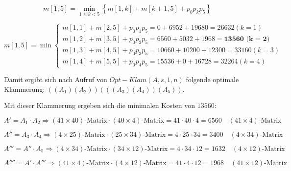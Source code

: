 \documentclass{article}
\begin{document}
\begin{equation}
m[1, 5] = \min\limits_{1 \leq k < 5} \left\{ m[1, k] + m[k + 1, 5] + p_0p_kp_5 \right\}
\end{equation}

\begin{equation}
m[1, 5] = \min\begin{cases}
  m[1, 1] + m[2, 5] + p_0p_1p_5 = 0 + 6952 + 19680 = 26632 (k = 1) \\
  m[1, 2] + m[3, 5] + p_0p_2p_5 = 6560 + 5032 + 1968 = \textbf{13560 (k = 2)} \\
  m[1, 3] + m[4, 5] + p_0p_3p_5 = 10660 + 10200 + 12300 = 33160 (k = 3) \\
  m[1, 4] + m[5, 5] + p_0p_4p_5 = 15536 + 0 + 16728 = 32264 (k = 4)
\end{cases}
\end{equation}

\clearpage

Damit ergibt sich nach Aufruf von $Opt-Klam(A, s, 1, n)$ folgende optimale
Klammerung:
$\left( \left( A_1 \right) \left( A_2 \right) \right) \left( \left( \left( A_3 \right) \left( A_4 \right) \right) \left( A_5 \right) \right)$.

Mit dieser Klammerung ergeben sich die minimalen Kosten von $13560$:

\begin{equation}
A' = A_1 \cdot A_2 \Rightarrow (41 \times 40)\text{-Matrix} \cdot (40 \times 4)\text{-Matrix} = 41 \cdot 40 \cdot 4 = 6560 \quad (41 \times 4)\text{-Matrix}
\end{equation}

\begin{equation}
A'' = A_3 \cdot A_4 \Rightarrow (4 \times 25)\text{-Matrix} \cdot (25 \times 34)\text{-Matrix} = 4 \cdot 25 \cdot 34 = 3400 \quad (4 \times 34)\text{-Matrix}
\end{equation}

\begin{equation}
A''' = A'' \cdot A_5 \Rightarrow (4 \times 34)\text{-Matrix} \cdot (34 \times 12)\text{-Matrix} = 4 \cdot 34 \cdot 12 = 1632 \quad (4 \times 12)\text{-Matrix}
\end{equation}

\begin{equation}
A'''' = A' \cdot A''' \Rightarrow (41 \times 4)\text{-Matrix} \cdot (4 \times 12)\text{-Matrix} = 41 \cdot 4 \cdot 12 = 1968 \quad (41 \times 12)\text{-Matrix}
\end{equation}
\end{document}
